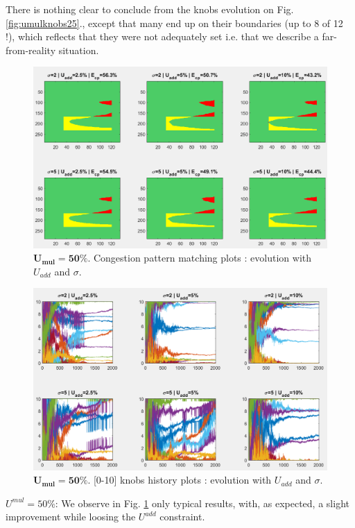 There is nothing clear to conclude from the knobs evolution on Fig. \ref{fig:umulknobs25}., except that many end up on their boundaries (up to 8 of 12 !), which reflects that they were not adequately set i.e. that we describe a far-from-reality situation.
\newpage
\begin{figure}[!h]
	\caption{$\mathbf{U_{mul}=50\%}$. Congestion pattern matching plots : evolution with $U_{add}$ and $\sigma$.}
	\label{fig:umulcp50}
	\centering
	\includegraphics[width=6.8in]{figures/results_figures/Umul/cp_Umul_50_lambda_11.png}
\end{figure}
\begin{figure}[!h]
	\caption{$\mathbf{U_{mul}=50\%}$. [0-10] knobs history plots : evolution with $U_{add}$ and $\sigma$.}
	\label{fig:umulknobs50}
	\includegraphics[width=7in]{figures/results_figures/Umul/knobs_Umul_50_lambda_11.png}
\end{figure}	
\emph{$U^{mul}=50\% $}: We observe in Fig. \ref{fig:umulcp50} only typical results, with, as expected, a slight improvement while loosing the $U^{add}$ constraint.\\
